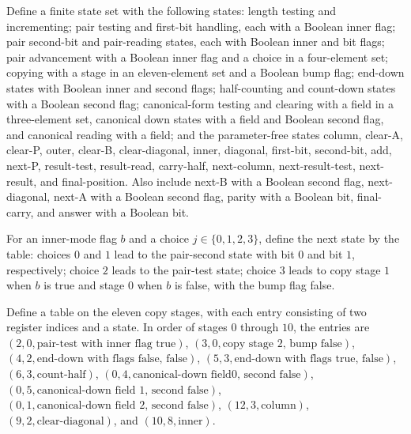 \begin{definition}
\label{Complexity.MultState}
\leanok
Define a finite state set with the following states: length testing and incrementing;
pair testing and first-bit handling, each with a Boolean inner flag; pair second-bit and
pair-reading states, each with Boolean inner and bit flags; pair advancement with a
Boolean inner flag and a choice in a four-element set; copying with a stage in an
eleven-element set and a Boolean bump flag; end-down states with Boolean inner and
second flags; half-counting and count-down states with a Boolean second flag;
canonical-form testing and clearing with a field in a three-element set, canonical down
states with a field and Boolean second flag, and canonical reading with a field; and the
parameter-free states column, clear-A, clear-P, outer, clear-B, clear-diagonal, inner,
diagonal, first-bit, second-bit, add, next-P, result-test, result-read, carry-half,
next-column, next-result-test, next-result, and final-position. Also include next-B with
a Boolean second flag, next-diagonal, next-A with a Boolean second flag, parity with a
Boolean bit, final-carry, and answer with a Boolean bit.
\end{definition}

\begin{definition}
\label{Complexity.multPairNext}
\leanok
{}
For an inner-mode flag $b$ and a choice $j\in\{0,1,2,3\}$, define the next state by the
table: choices $0$ and $1$ lead to the pair-second state with bit $0$ and bit $1$,
respectively; choice $2$ leads to the pair-test state; choice $3$ leads to copy stage
$1$ when $b$ is true and stage $0$ when $b$ is false, with the bump flag false.
\end{definition}

\begin{definition}
\label{Complexity.multCopy}
\leanok
{}
Define a table on the eleven copy stages, with each entry consisting of two register
indices and a state. In order of stages $0$ through $10$, the entries are
$(2,0,\text{pair-test with inner flag true})$, $(3,0,\text{copy stage }2\text{, bump
false})$, $(4,2,\text{end-down with flags false, false})$, $(5,3,\text{end-down with
flags true, false})$, $(6,3,\text{count-half})$, $(0,4,\text{canonical-down field
}0\text{, second false})$, $(0,5,\text{canonical-down field }1\text{, second false})$,
$(0,1,\text{canonical-down field }2\text{, second false})$, $(12,3,\text{column})$,
$(9,2,\text{clear-diagonal})$, and $(10,8,\text{inner})$.
\end{definition}

